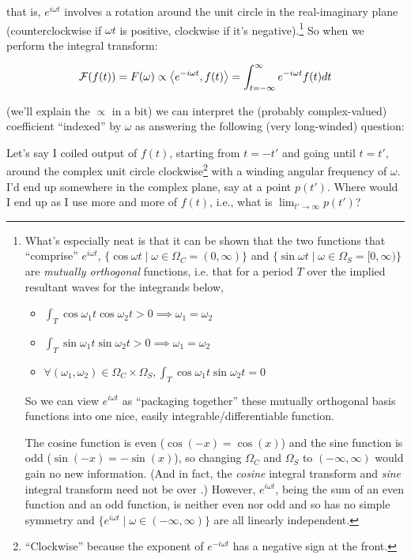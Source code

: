 \documentclass[letterpaper,12pt]{report}
\providecommand{\tightlist}{%
  \setlength{\itemsep}{0pt}\setlength{\parskip}{0pt}}
\begin{document}
that is, \(e^{i\omega t}\) involves a rotation around 
the unit circle in the real-imaginary plane 
(counterclockwise if \(\omega t\) is positive,
clockwise if it's negative).\footnote
{
  What's especially neat is
  that it can be shown that the two functions that ``comprise''
  \(e^{i\omega t}\), 
  \(\{\cos{\omega t} \mid \omega \in \Omega_{C} = (0, \infty) \}\) and 
  \(\{\sin{\omega t} \mid \omega \in \Omega_{S} = [0, \infty) \}\) are 
  \emph{mutually orthogonal} functions, i.e. that
  for a period \(T\) over the implied resultant waves
  for the integrands below,
  \begin{itemize}
    \item
      \(\int_{T}\cos{\omega_1t}\cos{\omega_2t} > 0 \implies \omega_1 = \omega_2\)
    \item
      \(\int_{T}\sin{\omega_1t}\sin{\omega_2t} > 0 \implies \omega_1 = \omega_2\)
    \item
    \(\forall 
      (\omega_1, \omega_2) \in \Omega_{C} \times \Omega_{S}, 
    \int_{T}\cos{\omega_1t}\sin{\omega_2t} = 0 \)
  \end{itemize}
  So we can view \(e^{i\omega t}\) as ``packaging together''
  these mutually orthogonal basis functions into one nice,
  easily integrable/differentiable function.\par

  The cosine function is even (\(\cos(-x) = \cos(x)\)) and
  the sine function is odd (\(\sin(-x) = -\sin(x)\)), so
  changing \(\Omega_{C}\) and \(\Omega_{S}\) to 
  \((-\infty, \infty)\) would gain no new information.
  (And in fact, the \emph{cosine} integral transform and
  \emph{sine} integral transform need not be over .)
  However, \(e^{i\omega t}\), being the sum of an even function
  and an odd function, is neither even nor odd and so
  has no simple symmetry and
  \(\{e^{i\omega t} \mid \omega \in (-\infty, \infty)\}\)
  are all linearly independent.
}
So when we perform the integral transform:

\[\mathcal{F}(f(t)) = F(\omega) 
  \propto \left<e^{-i\omega t},f(t)\right>
  = \int_{t=-\infty}^{\infty} e^{-i\omega t} f(t) dt\]

(we'll explain the \(\propto\) in a bit)
we can interpret the (probably complex-valued) coefficient
``indexed'' by \(\omega\) as answering the following
(very long-winded) question:\par

Let's say
I coiled output of \(f(t)\), 
starting from \(t=-t'\) and going until \(t=t'\),
around the complex unit circle clockwise\footnote{
  ``Clockwise'' because the exponent of \(e^{-i\omega t}\)
  has a negative sign at the front.
}
with a winding angular frequency of \(\omega\). I'd end
up somewhere in the complex plane, say at a point \(p(t')\).
Where would I end up as I use more and more of
\(f(t)\), i.e., what is \(\lim_{t' \rightarrow \infty} p(t')\)?
\par
\end{document}
